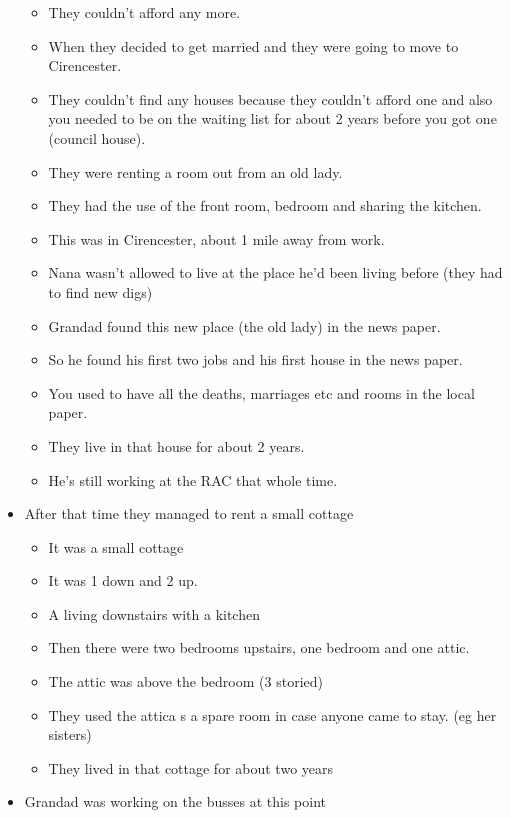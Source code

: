 \documentclass[10pt,twocolumn,letterpaper]{article}
\begin{document}
\begin{itemize}
\begin{itemize}
        \item They couldn't afford any more.
        \item When they decided to get married and they were going to move to Cirencester.
        \item They couldn't find any houses because they couldn't afford one and also you needed to be on the waiting list for about 2 years before you got one (council house).
        \item They were renting a room out from an old lady.
        \item They had the use of the front room, bedroom and sharing the kitchen.
        \item This was in Cirencester, about 1 mile away from work.
        \item Nana wasn't allowed to live at the place he'd been living before (they had to find new digs)
        \item Grandad found this new place (the old lady) in the news paper.
        \item So he found his first two jobs and his first house in the news paper.
        \item You used to have all the deaths, marriages etc and rooms in the local paper.
        \item They live in that house for about 2 years.
        \item He's still working at the RAC that whole time.
    \end{itemize}
    \item After that time they managed to rent a small cottage
    \begin{itemize}
        \item It was a small cottage
        \item It was 1 down and 2 up.
        \item A living downstairs with a kitchen
        \item Then there were two bedrooms upstairs, one bedroom and one attic.
        \item The attic was above the bedroom (3 storied)
        \item They used the attica s a spare room in case anyone came to stay. (eg her sisters)
        \item They lived in that cottage for about two years
    \end{itemize}
    \item Grandad was working on the busses at this point
    \begin{itemize}

\end{itemize}
\end{itemize}
\end{document}
